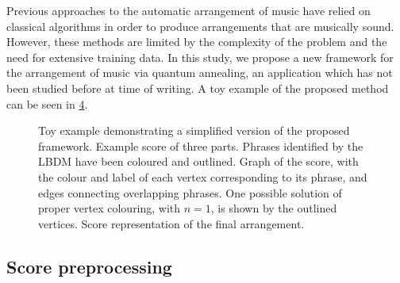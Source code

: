 \documentclass[twocolumn]{article}
\theoremstyle{definition}
\begin{document}
Previous approaches to the automatic arrangement of music have relied on classical algorithms in order to produce arrangements that are musically sound. However, these methods are limited by the complexity of the problem and the need for extensive training data. In this study, we propose a new framework for the arrangement of music via quantum annealing, an application which has not been studied before at time of writing. A toy example of the proposed method can be seen in \cref{fig:toy}.

\begin{figure}[!ht]
    \centering\footnotesize
    \begin{subfigure}{\textwidth}
        \centering
        
        \caption{}
        \label{fig:toy-score}
    \end{subfigure}
    \par\bigskip
    \begin{subfigure}{\textwidth}
        \centering
        
        \caption{}
        \label{fig:toy-graph}
    \end{subfigure}
    \par\bigskip
    \begin{subfigure}{\textwidth}
        \centering
        
        \caption{}
        \label{fig:toy-arrangement}
    \end{subfigure}

    \caption{Toy example demonstrating a simplified version of the proposed framework. \textbf{} Example score of three parts. Phrases identified by the LBDM have been coloured and outlined. \textbf{} Graph of the score, with the colour and label of each vertex corresponding to its phrase, and edges connecting overlapping phrases. One possible solution of proper vertex colouring, with $n=1$, is shown by the outlined vertices. \textbf{} Score representation of the final arrangement.}
    \label{fig:toy}
\end{figure}

\subsection*{Score preprocessing}
\end{document}
